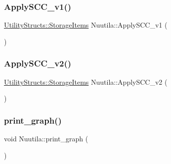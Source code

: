 \mbox{\label{class_nuutila_a6c355594f68dad8c28684114a6df6700_a6c355594f68dad8c28684114a6df6700}} 
\subsubsection{\texorpdfstring{Apply\+S\+C\+C\+\_\+v1()}{ApplySCC\_v1()}}
{\footnotesize\ttfamily \hyperlink{struct_utility_structs_1_1_storage_items}{Utility\+Structs\+::\+Storage\+Items} Nuutila\+::\+Apply\+S\+C\+C\+\_\+v1 (\begin{DoxyParamCaption}{ }\end{DoxyParamCaption})}

\mbox{\label{class_nuutila_a291d578f760e0f11a5c56c8a5fe02ebd_a291d578f760e0f11a5c56c8a5fe02ebd}} 
\subsubsection{\texorpdfstring{Apply\+S\+C\+C\+\_\+v2()}{ApplySCC\_v2()}}
{\footnotesize\ttfamily \hyperlink{struct_utility_structs_1_1_storage_items}{Utility\+Structs\+::\+Storage\+Items} Nuutila\+::\+Apply\+S\+C\+C\+\_\+v2 (\begin{DoxyParamCaption}{ }\end{DoxyParamCaption})}

\mbox{\label{class_nuutila_a0dc1cb3d0711a856a32a3743a85fb5c8_a0dc1cb3d0711a856a32a3743a85fb5c8}} 
\subsubsection{\texorpdfstring{print\+\_\+graph()}{print\_graph()}}
{\footnotesize\ttfamily void Nuutila\+::print\+\_\+graph (\begin{DoxyParamCaption}{ }\end{DoxyParamCaption})}

\mbox{\label{class_nuutila_ae11b94c396dff5b8d9b7f69ae0d0831f_ae11b94c396dff5b8d9b7f69ae0d0831f}} 

